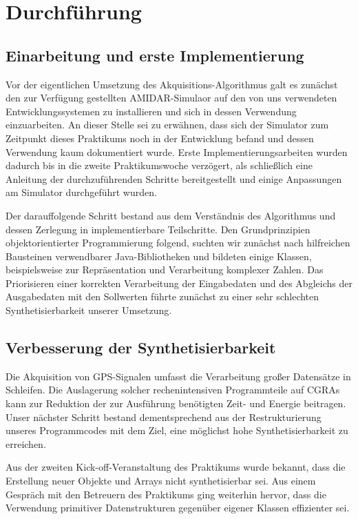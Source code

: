 \documentclass[parskip,
							 oneside,
							 11pt,
							 noheadingspace,
							 accentcolor=tud1d,
							 bigchapter,
							 colorback]{tudreport}
\begin{document}
\chapter{Durchführung}
\section{Einarbeitung und erste Implementierung}
Vor der eigentlichen Umsetzung des Akquisitions-Algorithmus galt es zunächst den zur Verfügung gestellten AMIDAR-Simulaor auf den von uns verwendeten Entwicklungssystemen zu installieren und sich in dessen Verwendung einzuarbeiten. An dieser Stelle sei zu erwähnen, dass sich der Simulator zum Zeitpunkt dieses Praktikums noch in der Entwicklung befand und dessen Verwendung kaum dokumentiert wurde. Erste Implementierungsarbeiten wurden dadurch bis in die zweite Praktikumswoche verzögert, als schließlich eine Anleitung der durchzuführenden Schritte bereitgestellt und einige Anpassungen am Simulator durchgeführt wurden.

Der darauffolgende Schritt bestand aus dem Verständnis des Algorithmus und dessen Zerlegung in implementierbare Teilschritte. Den Grundprinzipien objektorientierter Programmierung folgend, suchten wir zunächst nach hilfreichen Bausteinen verwendbarer Java-Bibliotheken und bildeten einige Klassen, beispielsweise zur Repräsentation und Verarbeitung komplexer Zahlen.
Das Priorisieren einer korrekten Verarbeitung der Eingabedaten und des Abgleichs der Ausgabedaten mit den Sollwerten führte zunächst zu einer sehr schlechten Synthetisierbarkeit unserer Umsetzung.

\section{Verbesserung der Synthetisierbarkeit}
Die Akquisition von GPS-Signalen umfasst die Verarbeitung großer Datensätze in Schleifen. Die Auslagerung solcher rechenintensiven Programmteile auf CGRAs kann zur Reduktion der zur Ausführung benötigten Zeit- und Energie beitragen. Unser nächster Schritt bestand dementsprechend aus der Restrukturierung unseres Programmcodes mit dem Ziel, eine möglichst hohe Synthetisierbarkeit zu erreichen. 

Aus der zweiten Kick-off-Veranstaltung des Praktikums wurde bekannt, dass die Erstellung neuer Objekte und Arrays nicht synthetisierbar sei. Aus einem Gespräch mit den Betreuern des Praktikums ging weiterhin hervor, dass die Verwendung primitiver Datenstrukturen gegenüber eigener Klassen effizienter sei. 
\end{document}
